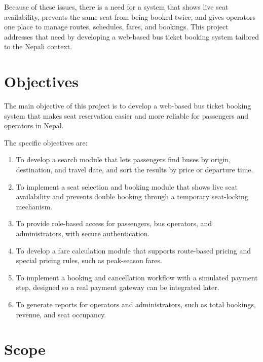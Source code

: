 \documentclass[12pt,a4paper,openany,oneside]{report}
\begin{document}
	Because of these issues, there is a need for a system that shows live seat availability, prevents the same seat from being booked twice, and gives operators one place to manage routes, schedules, fares, and bookings. This project addresses that need by developing a web-based bus ticket booking system tailored to the Nepali context.
	
	\section{Objectives}
	
	The main objective of this project is to develop a web-based bus ticket booking system that makes seat reservation easier and more reliable for passengers and operators in Nepal.
	
	The specific objectives are:
	\begin{enumerate}
		\item To develop a search module that lets passengers find buses by origin, destination, and travel date, and sort the results by price or departure time.
		\item To implement a seat selection and booking module that shows live seat availability and prevents double booking through a temporary seat-locking mechanism.
		\item To provide role-based access for passengers, bus operators, and administrators, with secure authentication.
		\item To develop a fare calculation module that supports route-based pricing and special pricing rules, such as peak-season fares.
		\item To implement a booking and cancellation workflow with a simulated payment step, designed so a real payment gateway can be integrated later.
		\item To generate reports for operators and administrators, such as total bookings, revenue, and seat occupancy.
	\end{enumerate}
	
	\section{Scope}
	
\end{document}
